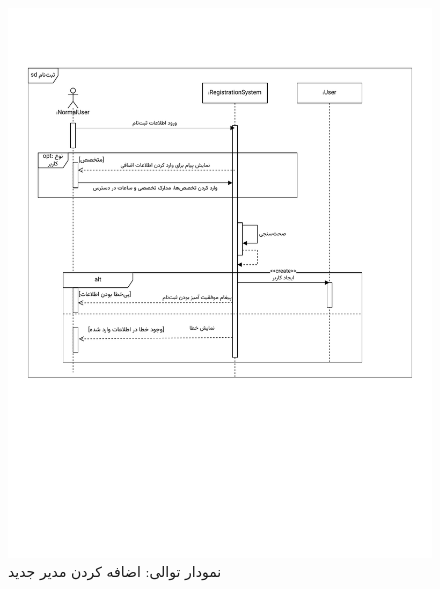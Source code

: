 \begin{figure}[ht!]
	\centering
	\includegraphics[scale=0.8, page=7]{figs/OOD-Sequence-1.pdf}
	\caption{نمودار توالی: اضافه کردن مدیر جدید}
\end{figure}
\FloatBarrier
\newpage

